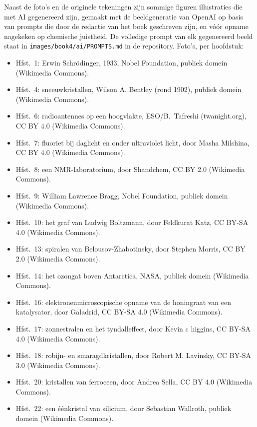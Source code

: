 \bigskip
Naast de foto's en de originele tekeningen zijn sommige figuren
illustraties die met AI gegenereerd zijn, gemaakt met de beeldgeneratie
van OpenAI op basis van prompts die door de redactie van het boek
geschreven zijn, en vóór opname nagekeken op chemische juistheid. De
volledige prompt van elk gegenereerd beeld staat in
\texttt{images/book4/ai/PROMPTS.md} in de repository.
\bigskip
\noindent Foto's, per hoofdstuk:
\begin{itemize}\small
  \item Hfst.~1: Erwin Schr\"odinger, 1933, Nobel Foundation, publiek domein
        (Wikimedia Commons).
  \item Hfst.~4: sneeuwkristallen, Wilson A. Bentley (rond 1902), publiek
        domein (Wikimedia Commons).
  \item Hfst.~6: radioantennes op een hoogvlakte, ESO/B.~Tafreshi
        (twanight.org), CC BY 4.0 (Wikimedia Commons).
  \item Hfst.~7: fluoriet bij daglicht en onder ultraviolet licht, door Masha
        Milshina, CC BY 4.0 (Wikimedia Commons).
  \item Hfst.~8: een NMR-laboratorium, door Shandchem, CC BY 2.0 (Wikimedia
        Commons).
  \item Hfst.~9: William Lawrence Bragg, Nobel Foundation, publiek domein
        (Wikimedia Commons).
  \item Hfst.~10: het graf van Ludwig Boltzmann, door Feldkurat Katz,
        CC BY-SA 4.0 (Wikimedia Commons).
  \item Hfst.~13: spiralen van Belousov-Zhabotinsky, door Stephen Morris,
        CC BY 2.0 (Wikimedia Commons).
  \item Hfst.~14: het ozongat boven Antarctica, NASA, publiek domein
        (Wikimedia Commons).
  \item Hfst.~16: elektronenmicroscopische opname van de honingraat van een
        katalysator, door Galadrid, CC BY-SA 4.0 (Wikimedia Commons).
  \item Hfst.~17: zonnestralen en het tyndalleffect, door Kevin c higgins,
        CC BY-SA 4.0 (Wikimedia Commons).
  \item Hfst.~18: robijn- en smaragdkristallen, door Robert M. Lavinsky,
        CC BY-SA 3.0 (Wikimedia Commons).
  \item Hfst.~20: kristallen van ferroceen, door Andrea Sella, CC BY 4.0
        (Wikimedia Commons).
  \item Hfst.~22: een éénkristal van silicium, door Sebastian Wallroth,
        publiek domein (Wikimedia Commons).

\end{itemize}

